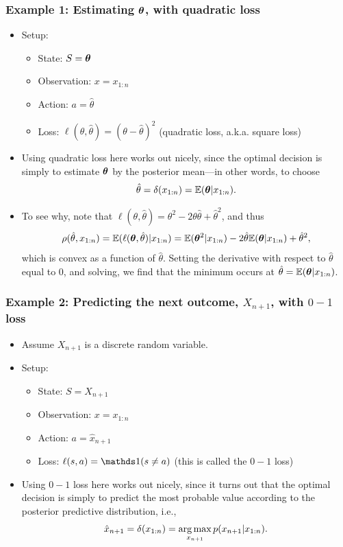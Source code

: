 \documentclass[12pt]{article}
\begin{document}
\subsubsection*{Example 1: Estimating ${\bm\theta}$, with quadratic loss}
\begin{itemize}
\item Setup:
\begin{itemize}
\item State: $S = {\bm\theta}$
\item Observation: $x = x_{1:n}$
\item Action: $a = \hat\theta$
\item Loss: $\ell(\theta,\hat\theta) = (\theta-\hat\theta)^2$ (quadratic loss, a.k.a. square loss)
\end{itemize}
\item Using quadratic loss here works out nicely, since the optimal decision is simply to estimate ${\bm\theta}$ by the posterior mean---in other words, to choose
$$\hat\theta = \delta(x_{1:n})=\mathbb{E}({\bm\theta}|x_{1:n}).$$
\item To see why, note that $\ell(\theta,\hat\theta) =\theta^2 - 2\theta\hat\theta + \hat\theta^2$, and thus
$$\rho(\hat\theta,x_{1:n})=\mathbb{E}(\ell({\bm\theta},\hat\theta)|x_{1:n}) =\mathbb{E}({\bm\theta}^2|x_{1:n}) - 2\hat\theta\mathbb{E}({\bm\theta}|x_{1:n}) +\hat\theta^2,$$
which is convex as a function of $\hat\theta$. Setting the derivative with respect to $\hat\theta$ equal to $0$, and solving, we find that the minimum occurs at $\hat\theta = \mathbb{E}({\bm\theta}|x_{1:n})$.
\end{itemize}


\subsubsection*{Example 2: Predicting the next outcome, $X_{n+1}$, with $0-1$ loss}
\begin{itemize}
\item Assume $X_{n+1}$ is a discrete random variable.
\item Setup:
\begin{itemize}
\item State: $S = X_{n+1}$
\item Observation: $x = x_{1:n}$
\item Action: $a = \hat x_{n+1}$
\item Loss: $\ell(s,a) = \I(s\neq a)$ (this is called the $0-1$ loss)
\end{itemize}
\item Using $0-1$ loss here works out nicely, since it turns out that the optimal decision is simply to predict the most probable value according to the posterior predictive distribution, i.e.,
$$\hat x_{n+1} = \delta(x_{1:n})=\operatorname*{arg\,max}_{x_{n+1}} p(x_{n+1}|x_{1:n}).$$
\end{itemize}
\end{document}
